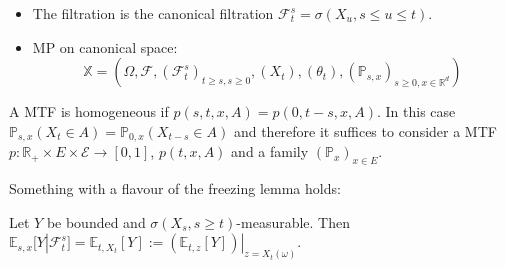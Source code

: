 \begin{itemize}
    
    \item The filtration is the canonical filtration $\mathcal{F}_t^s = \sigma(X_u, s \le u \le t)$.
    
    \item MP on canonical space:
    $$\mathbb{X} = (\Omega, \mathcal{F}, (\mathcal{F}_t^s)_{t \ge s, s \ge 0}, (X_t), (\theta_t), (\mathbb{P}_{s,x})_{s \ge 0, x \in \mathbb{R}^d})$$
\end{itemize}

\begin{remark}[Homogeneous MP]
    A MTF is homogeneous if $p(s,t,x,A) = p(0, t-s, x, A)$. In this case $\mathbb{P}_{s,x}(X_t \in A) = \mathbb{P}_{0,x}(X_{t-s} \in A)$ and therefore it suffices to consider a MTF $p: \mathbb{R}_+ \times E \times \mathcal{E} \to [0,1]$, $p(t,x,A)$ and a family $(\mathbb{P}_x)_{x \in E}$.
\end{remark}

Something with a flavour of the freezing lemma holds:

\begin{proposition}
    Let $Y$ be bounded and $\sigma(X_s, s \ge t)$-measurable. Then $\mathbb{E}_{s,x}[Y | \mathcal{F}_t^s] = \mathbb{E}_{t, X_t}[Y] := (\mathbb{E}_{t,z}[Y])|_{z=X_t(\omega)}$.
\end{proposition}

